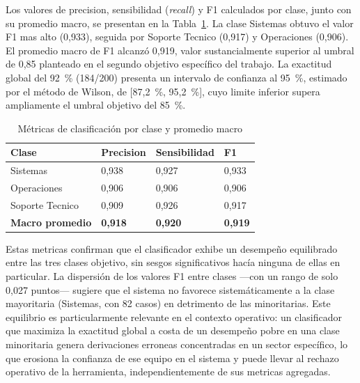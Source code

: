 Los valores de precision, sensibilidad (\emph{recall}) y F1 calculados por clase, junto con su promedio macro, se presentan en la Tabla~\ref{tab:metricas}. La clase Sistemas obtuvo el valor F1 mas alto (0,933), seguida por Soporte Tecnico (0,917) y Operaciones (0,906). El promedio macro de F1 alcanzó 0,919, valor sustancialmente superior al umbral de 0,85 planteado en el segundo objetivo específico del trabajo. La exactitud global del 92~\% (184/200) presenta un intervalo de confianza al 95~\%, estimado por el método de Wilson, de [87,2~\%, 95,2~\%], cuyo limite inferior supera ampliamente el umbral objetivo del 85~\%.

\begin{table}[htbp]
\centering
\caption{Métricas de clasificación por clase y promedio macro}
\label{tab:metricas}
\begin{tabular}{@{}p{3.5cm} p{3.0cm} p{3.0cm} p{2.5cm}@{}}
\toprule
\textbf{Clase} & \textbf{Precision} & \textbf{Sensibilidad} & \textbf{F1} \\
\midrule
Sistemas         & 0,938 & 0,927 & 0,933 \\
Operaciones      & 0,906 & 0,906 & 0,906 \\
Soporte Tecnico  & 0,909 & 0,926 & 0,917 \\
\midrule
\textbf{Macro promedio} & \textbf{0,918} & \textbf{0,920} & \textbf{0,919} \\
\bottomrule
\end{tabular}
\end{table}

Estas metricas confirman que el clasificador exhibe un desempeño equilibrado entre las tres clases objetivo, sin sesgos significativos hacía ninguna de ellas en particular. La dispersión de los valores F1 entre clases ---con un rango de solo 0,027 puntos--- sugiere que el sistema no favorece sistemáticamente a la clase mayoritaria (Sistemas, con 82 casos) en detrimento de las minoritarias. Este equilibrio es particularmente relevante en el contexto operativo: un clasificador que maximiza la exactitud global a costa de un desempeño pobre en una clase minoritaria genera derivaciones erroneas concentradas en un sector específico, lo que erosiona la confianza de ese equipo en el sistema y puede llevar al rechazo operativo de la herramienta, independientemente de sus metricas agregadas.

